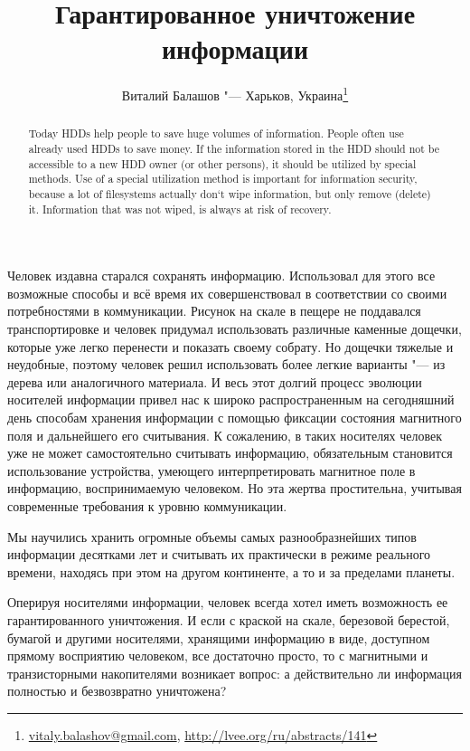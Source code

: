 \documentclass[10pt, a5paper]{article}
\begin{document}
\title{Гарантированное уничтожение информации}
\author{Виталий Балашов "--- Харьков, Украина\footnote{\url{vitaly.balashov@gmail.com}, \url{http://lvee.org/ru/abstracts/141}}}
\maketitle
\begin{abstract}
Today HDDs help people to save huge volumes of information.  People often use already used HDDs to save money. If the infor\-mation stored in the HDD should not be accessible to a new HDD owner (or other persons), it should be utilized by special methods. Use of a special utilization method is important for information security, because a lot of filesystems actually don`t wipe information, but only remove (delete) it. Information that was not wiped, is always at risk of recovery.  
\end{abstract}
Человек издавна старался сохранять информацию. Использовал для этого все возможные способы и всё время их совершенствовал в соответствии со своими потребностями в коммуникации. Рисунок на скале в пещере не поддавался транспортировке и человек придумал использовать различные каменные дощечки, которые уже легко перенести и показать своему собрату. Но дощечки тяжелые и неудобные, поэтому человек решил использовать более легкие варианты "--- из дерева или аналогичного материала.  И весь этот долгий процесс эволюции носителей информации привел нас к широко распространенным на сегодняшний день способам хранения информации с помощью фиксации состояния магнитного поля  и дальнейшего его считывания.  К сожалению, в таких носителях человек уже не может самостоятельно считывать информацию, обязательным становится использование устройства, умеющего интерпретировать магнитное поле в информацию, воспринимаемую человеком. Но эта жертва простительна, учитывая современные требования к уровню коммуникации.

Мы научились хранить огромные объемы самых разнообразнейших типов информации десятками лет и считывать их практически в режиме реального времени, находясь при этом на другом континенте, а то и за пределами планеты.

Оперируя носителями информации, человек всегда хотел иметь возможность ее гарантированного уничтожения. И если с краской на скале, березовой берестой, бумагой и другими носителями, хранящими информацию в виде, доступном прямому восприятию человеком, все достаточно просто, то с магнитными и транзисторными накопителями возникает вопрос: а действительно ли информация полностью и безвозвратно уничтожена?
\end{document}
